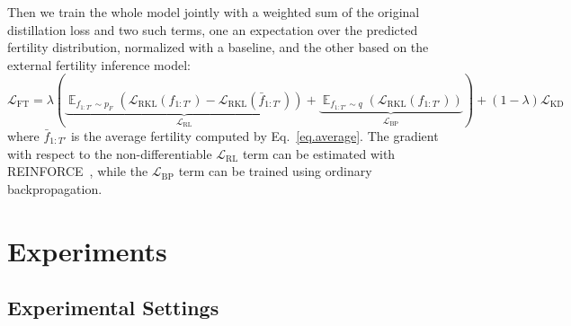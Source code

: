 Then we train the whole model jointly with a weighted sum of the original distillation loss and two such terms, one an expectation over the predicted fertility distribution, normalized with a baseline, and the other based on the external fertility inference model:
\begin{equation}
\mathcal{L}_\text{FT} = \lambda \left(\underbrace{\mathop{\mathbb{E}}_{f_{1:T'} \sim p_F}\left(\mathcal{L}_\text{RKL}\left(f_{1:T'}\right) - \mathcal{L}_\text{RKL}\left(\bar{f}_{1:T'}\right)\right)}_{\mathcal{L}_\text{RL}} + \underbrace{\mathop{\mathbb{E}}_{f_{1:T'} \sim q}\left(\mathcal{L}_\text{RKL}\left(f_{1:T'}\right)\right)}_{\mathcal{L}_\text{BP}}\right) + (1 - \lambda)\mathcal{L}_\text{KD}
\end{equation}
where $\bar{f}_{1:T'}$ is the average fertility computed by Eq.~\ref{eq.average}.
The gradient with respect to the non-differentiable $\mathcal{L}_\text{RL}$ term can be estimated with REINFORCE~\citep{williams1992simple}, while the $\mathcal{L}_\text{BP}$ term can be trained using ordinary backpropagation.

\section{Experiments}
\subsection{Experimental Settings}
\vspace{-5pt}
